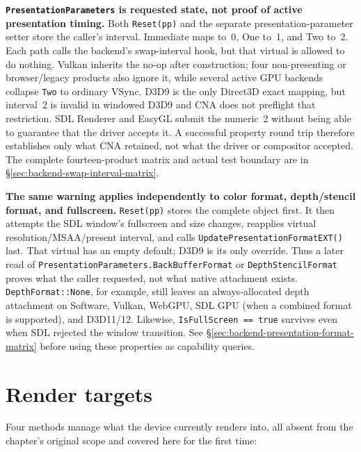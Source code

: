 \begin{sourcenote}
\textbf{\texttt{PresentationParameters} is requested state, not proof of active presentation
timing.} Both \texttt{Reset(pp)} and the separate presentation-parameter setter store the
caller's interval. Immediate maps to~0, One to~1, and Two to~2. Each path calls the backend's
swap-interval hook, but that virtual is allowed to do nothing. Vulkan inherits the no-op
after construction; four non-presenting or
browser/legacy products also ignore it, while several active GPU backends collapse
\texttt{Two} to ordinary VSync. D3D9 is the only Direct3D exact mapping, but interval~2 is
invalid in windowed D3D9 and CNA does not preflight that restriction. SDL Renderer and
EasyGL submit the numeric~2 without being able to guarantee that the driver accepts it. A
successful property round trip therefore establishes only what CNA retained, not what the
driver or compositor accepted. The complete fourteen-product matrix and actual test boundary
are in \S\ref{sec:backend-swap-interval-matrix}.
\end{sourcenote}

\begin{sourcenote}
\textbf{The same warning applies independently to color format, depth/stencil format, and
fullscreen.} \texttt{Reset(pp)} stores the complete object first. It then attempts the SDL
window's fullscreen and size changes, reapplies virtual resolution/MSAA/present interval, and
calls \texttt{UpdatePresentationFormatEXT()} last. That virtual has an empty default; D3D9 is
its only override. Thus a later read of
\texttt{PresentationParameters.BackBufferFormat} or \texttt{DepthStencilFormat} proves what
the caller requested, not what native attachment exists. \texttt{DepthFormat::None}, for
example, still leaves an always-allocated depth attachment on Software, Vulkan, WebGPU, SDL
GPU (when a combined format is supported), and D3D11/12. Likewise,
\texttt{IsFullScreen == true} survives even when SDL rejected the window transition. See
\S\ref{sec:backend-presentation-format-matrix} before using these properties as capability
queries.
\end{sourcenote}

\section{Render targets}
\label{sec:render-targets}

Four methods manage what the device currently renders into, all absent from the chapter's
original scope and covered here for the first time:

